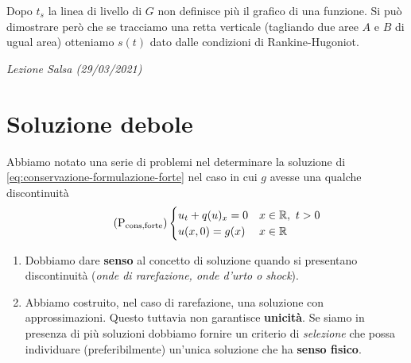 \documentclass[10pt,a4paper,twoside,openright]{book}
\newcounter{conteggioS}
\newcommand{\LezioneS}[1]{
	\stepcounter{conteggioS}
	\textit{Lezione Salsa \arabic{conteggioS} (#1)}
	}
\begin{document}
Dopo $\displaystyle t_{s}$ la linea di livello di $G$ non definisce più il grafico di una funzione.
Si può dimostrare però che se tracciamo una retta verticale (tagliando due aree $A$ e $B$ di ugual area) otteniamo $\displaystyle s(t)$ dato dalle condizioni di Rankine-Hugoniot.


\LezioneS{29/03/2021}
\section{Soluzione debole}

Abbiamo notato una serie di problemi nel determinare la soluzione di \eqref{eq:conservazione-formulazione-forte} nel caso in cui $g$ avesse una qualche discontinuità
\begin{equation}
    \tag{P$_{\text{cons,forte}}$}
    \begin{cases}
        u_{t} +q(u)_{x} =0 & x\in \mathbb{R} ,\ t >0 \\
        u(x,0) =g(x)       & x\in \mathbb{R}
    \end{cases}
    \label{eq:conservazione-formulazione-forte}
\end{equation}
\begin{enumerate}
    \item Dobbiamo dare \textbf{senso} al concetto di soluzione quando si presentano discontinuità (\textit{onde di rarefazione, onde d'urto o shock}).
    \item Abbiamo costruito, nel caso di rarefazione, una soluzione con approssimazioni. Questo tuttavia non garantisce \textbf{unicità}. Se siamo in presenza di più soluzioni dobbiamo fornire un criterio di \textit{selezione} che possa individuare (preferibilmente) un'unica soluzione che ha \textbf{senso fisico}.
\end{enumerate}
\end{document}
